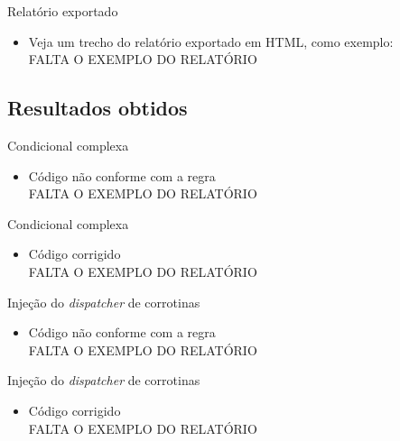 \documentclass[brazilian]{beamer}
\begin{document}
\begin{frame}{Relatório exportado}
    \begin{itemize}
        \item Veja um trecho do relatório exportado em HTML, como exemplo:
        \\ \color{red} \huge{FALTA O EXEMPLO DO RELATÓRIO}
    \end{itemize}
\end{frame}

\subsection{Resultados obtidos}

\begin{frame}{Condicional complexa}
    \begin{itemize}
        \item Código não conforme com a regra
        \\ \color{red} \huge{FALTA O EXEMPLO DO RELATÓRIO}
    \end{itemize}
\end{frame}

\begin{frame}{Condicional complexa}
    \begin{itemize}
        \item Código corrigido
        \\ \color{red} \huge{FALTA O EXEMPLO DO RELATÓRIO}
    \end{itemize}
\end{frame}

\begin{frame}{Injeção do \textit{dispatcher} de corrotinas}
    \begin{itemize}
        \item Código não conforme com a regra
        \\ \color{red} \huge{FALTA O EXEMPLO DO RELATÓRIO}
    \end{itemize}
\end{frame}

\begin{frame}{Injeção do \textit{dispatcher} de corrotinas}
    \begin{itemize}
        \item Código corrigido
        \\ \color{red} \huge{FALTA O EXEMPLO DO RELATÓRIO}
    \end{itemize}
\end{frame}
\end{document}
